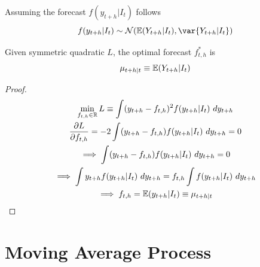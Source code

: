\documentclass[11pt]{article}
\begin{document}
		\begin{assumption}
			Assuming the forecast $f(y_{t+h}|I_t)$ follows
			\begin{equation}
				f(y_{t+h}|I_t) \sim \mc{N}(\expect{Y_{t+h}|I_t}, \var{Y_{t+h}|I_t})
			\end{equation}
		\end{assumption}
		
		\begin{proposition}
			Given symmetric quadratic $L$, the optimal forecast $f^*_{t,h}$ is 
			\begin{equation}
				\mu_{t+h|t} \equiv \mathbb{E}({Y_{t+h}|I_t})
			\end{equation}
			\begin{proof}
				\begin{gather}
					\min_{f_{t, h} \in \R} L \equiv \int (y_{t+h} - f_{t, h})^2 f(y_{t+h}|I_t)\ dy_{t+h} \\
					\pd{L}{f_{t, h}} = -2 \int (y_{t+h} - f_{t, h}) f(y_{t+h}|I_t)\ dy_{t+h} = 0 \\
					\implies \int (y_{t+h} - f_{t, h}) f(y_{t+h}|I_t)\ dy_{t+h} = 0 \\
					\implies \int y_{t+h} f(y_{t+h}|I_t)\ dy_{t+h} = f_{t, h} \int  f(y_{t+h}|I_t)\ dy_{t+h} \\
					\implies f_{t, h} = \expect{y_{t+h}|I_t} \equiv \mu_{t+h|t}
				\end{gather}
			\end{proof}
		\end{proposition}
		
	\section{Moving Average Process}
\end{document}

